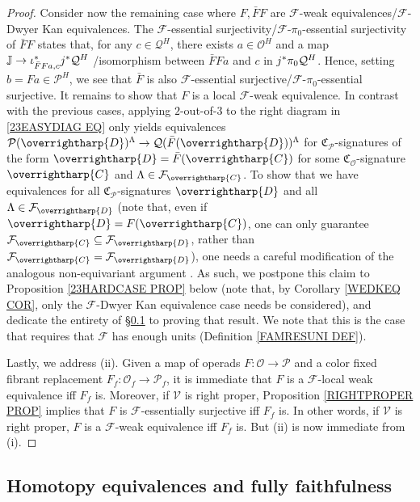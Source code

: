 \documentclass[a4paper,10pt
 ,final
]{article}%
\numberwithin{equation}{section}
\numberwithin{figure}{section}
\theoremstyle{definition} %
\newcommand{\vect}[1]{\text{\overrightharp{\ensuremath{#1}}}}
\newcommand{\F}{\ensuremath{\mathcal F}}
\newcommand{\V}{\ensuremath{\mathcal V}}
\renewcommand{\O}{\ensuremath{\mathcal O}}
\renewcommand{\P}{\ensuremath{\mathcal P}}
\newcommand{\1}{\ensuremath{\mathbbm 1}}%
\begin{document}
\begin{proof}
Consider now the remaining case where
$F,\bar{F}F$ are
$\F$-weak equivalences/$\F$-Dwyer Kan equivalences.
The $\F$-essential surjectivity/$\F$-$\pi_0$-essential surjectivity
of $\bar{F}F$
states that, for any $c \in \mathcal{Q}^H$,
there exists $a \in \mathcal{O}^H$ and a map
$\mathbb{J} \to \iota^{\**}_{\bar{F}Fa,c} j^{\**}\mathcal{Q}^H$
/isomorphism between $\bar{F}Fa$ and 
$c$ in $j^{\**}\pi_0\mathcal{Q}^H$.
Hence, setting $b = Fa \in \mathcal{P}^H$,
we see that $\bar{F}$ is also
$\F$-essential surjective/$\F$-$\pi_0$-essential surjective.
It remains to show that
$F$ is a local $\F$-weak equivalence.
In contrast with the previous cases,
applying $2$-out-of-$3$ to the right diagram in \eqref{23EASYDIAG EQ}
only yields equivalences 
$\P(\vect{D})^{\Lambda} \to \mathcal{Q}(\bar{F}(\vect{D}))^{\Lambda}$
for $\mathfrak{C}_{\P}$-signatures of the form
$\vect{D} = \bar{F} (\vect{C})$ for some $\mathfrak{C}_{\O}$-signature $\vect{C}$ 
and $\Lambda \in \F_{\vect{C}}$.
To show that we have equivalences for all
$\mathfrak{C}_{\P}$-signatures $\vect{D}$
and all $\Lambda \in \F_{\vect{D}}$
(note that, even if $\vect{D} = F(\vect{C})$,
one can only guarantee $\F_{\vect{C}} \subseteq \F_{\vect{D}}$,
rather than $\F_{\vect{C}} = \F_{\vect{D}}$),
one needs a careful modification of the analogous non-equivariant argument \cite[Lemma 4.14]{Cav}.
As such, we postpone this claim to 
Proposition \ref{23HARDCASE PROP} below
(note that, by Corollary \ref{WEDKEQ COR}, 
only the $\F$-Dwyer Kan equivalence case needs be considered),
and dedicate the entirety of \S \ref{HMTYEQ SEC}
to proving that result.
We note that this is the case that requires that $\F$ has enough units (Definition \ref{FAMRESUNI DEF}).


Lastly, we address (ii).
Given a map of operads $F\colon \O \to \P$ and a color fixed fibrant replacement
$F_f \colon \O_f \to \P_f$,
it is immediate that 
$F$ is a $\F$-local weak equivalence iff $F_f$ is.
Moreover, if $\V$ is right proper, Proposition \ref{RIGHTPROPER PROP}
implies that $F$ is $\F$-essentially surjective iff $F_f$ is.
In other words, if $\V$ is right proper,
$F$ is a $\F$-weak equivalence iff $F_f$ is.
But (ii) is now immediate from (i).
\end{proof}






\subsection{Homotopy equivalences and fully faithfulness}
\label{HMTYEQ SEC}
\end{document}
